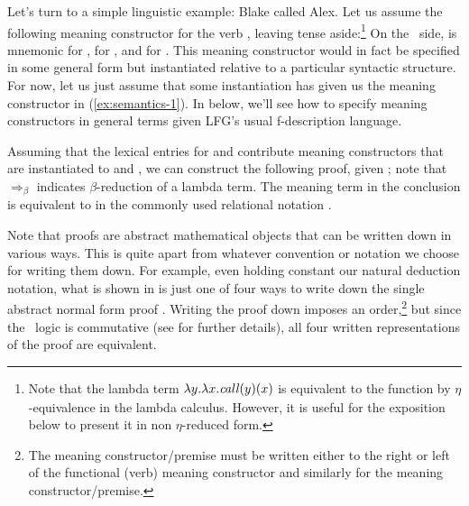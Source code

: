 \documentclass[output=paper,hidelinks]{langscibook}
\begin{document}
Let's turn to a simple linguistic example:
\ea
Blake called Alex. 
\z
%
Let us assume the following meaning constructor for the verb
, leaving tense aside:\footnote{\label{fn:eta}Note that the
  lambda term $\formula{\lambda
  y.\lambda x.\IT{call}(y)(x)}$ is equivalent to the function 
   by 
  $\eta$-equivalence in the lambda calculus. However, it is useful for
 the exposition below 
  to present it in non $\eta$-reduced form.}
\ea \label{ex:semantics-1} 
\z
%
On the \glue\ side,  is mnemonic for ,
 for , and  for . This
meaning constructor would in fact be specified in
some general form but instantiated relative to a particular syntactic
structure. For now, let us just assume that some instantiation has given us the
meaning constructor in (\ref{ex:semantics-1}). In  below,
we'll see how to specify meaning constructors in general terms given
LFG's usual f-description language. 

Assuming that the lexical entries for  and 
contribute meaning constructors that are instantiated to
 and , we can construct
the following proof, given ; note that
$\Rightarrow_\beta$ indicates $\beta$-reduction of a lambda term. 
%
The meaning term in the conclusion is equivalent to
 in the commonly used
  relational notation \citep{montague73}. 

Note that proofs are abstract mathematical objects that can be
written down in various ways. This is quite apart from whatever convention
or notation we choose for writing them down. For example, even holding
constant our natural deduction notation, what is shown in
 is just one of four ways to write down the single
abstract normal form proof \citep{prawitz65}. Writing the proof down
imposes an order,\footnote{The  meaning constructor/premise must be
  written either to the right or left of the functional (verb) meaning constructor and similarly
  for the  meaning constructor/premise.} but since the \glue\ logic is commutative
(see  for further details), all four
written representations of the proof are equivalent. 
\end{document}
